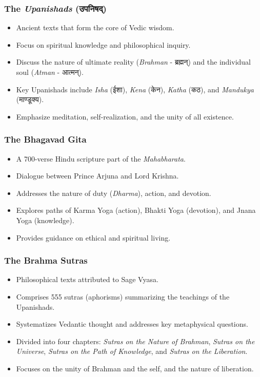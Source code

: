 \begin{frame}[fragile]\frametitle{The \textit{Upanishads} (उपनिषद्)}

      \begin{itemize}
		\item Ancient texts that form the core of Vedic wisdom.
		\item Focus on spiritual knowledge and philosophical inquiry.
		\item Discuss the nature of ultimate reality (\textit{Brahman} - ब्रह्मन्) and the individual soul (\textit{Atman} - आत्मन्).
		\item Key Upanishads include \textit{Isha} (ईशा), \textit{Kena} (केन), \textit{Katha} (कठ), and \textit{Mandukya} (माण्डूक्य).
		\item Emphasize meditation, self-realization, and the unity of all existence.
	  \end{itemize}

\end{frame}


\begin{frame}[fragile]\frametitle{The Bhagavad Gita}

      \begin{itemize}
		\item A 700-verse Hindu scripture part of the \textit{Mahabharata}.
		\item Dialogue between Prince Arjuna and Lord Krishna.
		\item Addresses the nature of duty (\textit{Dharma}), action, and devotion.
		\item Explores paths of Karma Yoga (action), Bhakti Yoga (devotion), and Jnana Yoga (knowledge).
		\item Provides guidance on ethical and spiritual living.
	  \end{itemize}

\end{frame}

\begin{frame}[fragile]\frametitle{The Brahma Sutras}

      \begin{itemize}
		\item Philosophical texts attributed to Sage Vyasa.
		\item Comprises 555 sutras (aphorisms) summarizing the teachings of the Upanishads.
		\item Systematizes Vedantic thought and addresses key metaphysical questions.
		\item Divided into four chapters: \textit{Sutras on the Nature of Brahman}, \textit{Sutras on the Universe}, \textit{Sutras on the Path of Knowledge}, and \textit{Sutras on the Liberation}.
		\item Focuses on the unity of Brahman and the self, and the nature of liberation.
	  \end{itemize}

\end{frame}


